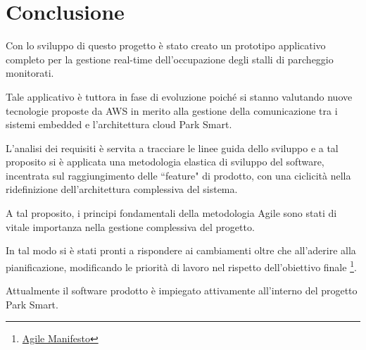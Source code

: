 \chapter{Conclusione}


Con lo sviluppo di questo progetto è stato creato un prototipo applicativo completo per la gestione real-time dell'occupazione degli stalli di parcheggio monitorati. 
\newline

Tale applicativo è tuttora in fase di evoluzione poiché si stanno valutando nuove tecnologie proposte da AWS in merito alla gestione della comunicazione tra i sistemi embedded e l'architettura cloud Park Smart. 
\newline

L'analisi dei requisiti è servita a tracciare le linee guida dello sviluppo e a tal proposito si è applicata una metodologia elastica di sviluppo del software, incentrata sul raggiungimento delle ``feature" di prodotto, con una ciclicità nella ridefinizione dell'architettura complessiva del sistema.
\newline

A tal proposito, i principi fondamentali della metodologia Agile sono stati di vitale importanza nella gestione complessiva del progetto.
\newline

In tal modo si è stati pronti a rispondere ai cambiamenti oltre che all'aderire alla pianificazione, modificando le priorità di lavoro nel rispetto dell'obiettivo finale \footnote{\href{http://www.agilemanifesto.org}{Agile Manifesto}}. 
\newline

Attualmente il software prodotto è impiegato attivamente all'interno del progetto Park Smart.	